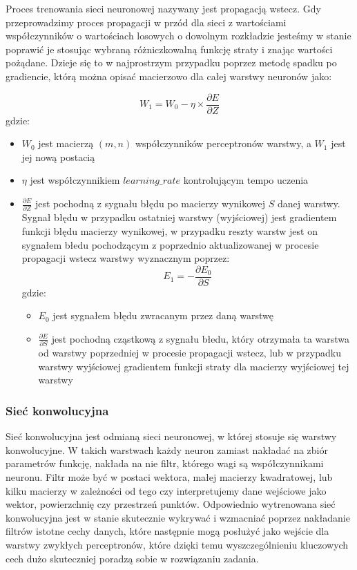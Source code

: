 \documentclass{article}
\begin{document}
Proces trenowania sieci neuronowej nazywany jest propagacją wstecz. Gdy 
przeprowadzimy proces propagacji w przód dla sieci z wartościami współczynników
o wartościach losowych o dowolnym rozkładzie jesteśmy w stanie poprawić 
je stosując wybraną różniczkowalną funkcję straty i znając wartości pożądane. Dzieje się to 
w najprostrzym przypadku poprzez metodę spadku po gradiencie, którą można 
opisać macierzowo dla całej warstwy neuronów jako:

\begin{equation}
    W_1 = W_0 - \eta \times \frac{\partial E}{\partial Z}
\end{equation}
gdzie:
\begin{itemize}
    \item $W_0$ jest macierzą $(m, n)$ współczynników perceptronów warstwy, a $W_1$ jest jej nową postacią
    \item $\eta$ jest współczynnikiem $learning\_rate$ kontrolującym tempo uczenia
    \item $\frac{\partial E}{\partial Z}$ jest pochodną z sygnału błędu po 
    macierzy wynikowej $S$ danej warstwy. Sygnał błędu w przypadku ostatniej warstwy (wyjściowej) jest
    gradientem funkcji błędu macierzy wynikowej, w przypadku reszty warstw 
    jest on sygnałem błedu pochodzącym z poprzednio aktualizowanej w procesie propagacji wstecz warstwy
    wyznacznym poprzez:
    \begin{equation}
        E_1 = -\frac{\partial E_0}{\partial S}
    \end{equation}
    gdzie:
    \begin{itemize}
        \item $E_0$ jest sygnałem błędu zwracanym przez daną warstwę
        \item $\frac{\partial E}{\partial S}$ jest pochodną cząstkową z sygnału błedu, 
        który otrzymała ta warstwa od warstwy poprzedniej w procesie propagacji wstecz, lub w przypadku warstwy
        wyjściowej gradientem funkcji straty dla macierzy wyjściowej tej warstwy
    \end{itemize}
\end{itemize}

\subsubsection{Sieć konwolucyjna}
Sieć konwolucyjna jest odmianą sieci neuronowej, 
w której stosuje się warstwy konwolucyjne. W takich 
warstwach każdy neuron zamiast nakładać na zbiór parametrów 
funkcję, nakłada na nie filtr, którego wagi są współczynnikami 
neuronu. Filtr może być w postaci wektora, małej macierzy kwadratowej, 
lub kilku macierzy w zależności od tego czy interpretujemy dane wejściowe 
jako wektor, powierzchnię czy przestrzeń punktów. Odpowiednio wytrenowana 
sieć konwolucyjna jest w stanie skutecznie wykrywać i wzmacniać poprzez
nakładanie filtrów istotne cechy danych, które następnie mogą posłużyć 
jako wejście dla warstwy zwykłych perceptronów, które dzięki temu wyszczególnieniu 
kluczowych cech dużo skuteczniej poradzą sobie w rozwiązaniu zadania.
\end{document}
